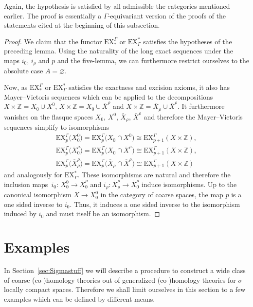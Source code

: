 \documentclass[pdftex]{sigma}
\numberwithin{equation}{section}
\theoremstyle{definition}
\newcommand{\Z}{\mathbb{Z}}
\newcommand{\HomolX}{\mathrm{EX}}
\newcommand{\CohomX}{\mathrm{EX}}
\begin{document}
Again, the hypothesis is satisfied by all admissible the categories mentioned earlier.
The proof is essentially a $\Gamma$-equivariant version of the proofs of the statements cited at the beginning of this subsection.


\begin{proof}
We claim that the functor $\HomolX^\Gamma_*$ or $\CohomX_\Gamma^*$ satisfies the hypotheses of the preceding lemma.
Using the naturality of the long exact sequences under the maps $i_0$, $i_\rho$ and $p$ and the five-lemma, we can furthermore restrict ourselves to the absolute case $A=\varnothing$.

Now, as $\HomolX^\Gamma_*$ or $\CohomX_\Gamma^*$ satisfies the exactness and excision axioms, it also has Mayer--Vietoris sequences which can be applied to the decompositions $X\times\Z=X_0\cup X^0$, $X\times\Z=X_0\cup \overline X^\rho$ and $X\times\Z=\overline X_\rho\cup \overline X^\rho$. It furthermore vanishes on the flasque spaces $X_0$, $X^0$, $\overline X_\rho$, $\overline X^\rho$ and therefore the Mayer--Vietoris sequences simplify to isomorphisms
\begin{gather*}
\HomolX^\Gamma_p\big(X_0^0\big)=\HomolX^\Gamma_p\big(X_0\cap X^0\big)\cong \HomolX^\Gamma_{p+1}(X\times\Z),
\\
\HomolX^\Gamma_p\big(\overline X_0^\rho\big)=\HomolX^\Gamma_p\big(X_0\cap \overline X^\rho\big)\cong \HomolX^\Gamma_{p+1}(X\times\Z),
\\
\HomolX^\Gamma_p\big(\overline X_\rho^\rho\big)=\HomolX^\Gamma_p\big(\overline X_\rho\cap \overline X^\rho\big)\cong \HomolX^\Gamma_{p+1}(X\times\Z)
\end{gather*}
and analogously for $\CohomX_\Gamma^*$.
These isomorphisms are natural and therefore the inclusion maps~$i_0$: $X_0^0\to \overline X_0^\rho$ and $i_\rho\colon \overline X_\rho^\rho\to \overline X_0^\rho$ induce isomorphisms. Up to the canonical isomorphism $X\to X_0^0$ in the category of coarse spaces, the map $p$ is a one sided inverse to $i_0$. Thus, it induces a one sided inverse to the isomorphism induced by $i_0$ and must itself be an isomorphism.
\end{proof}

\section{Examples}\label{sec:Examples}
In Section~\ref{sec:Sigmastuff} we will describe a procedure to construct a wide class of coarse \mbox{(co-)}homology theories out of generalized \mbox{(co-)}homology theories for $\sigma$-locally compact spaces.
Therefore we shall limit ourselves in this section to a few examples which can be defined by different means.
\end{document}
